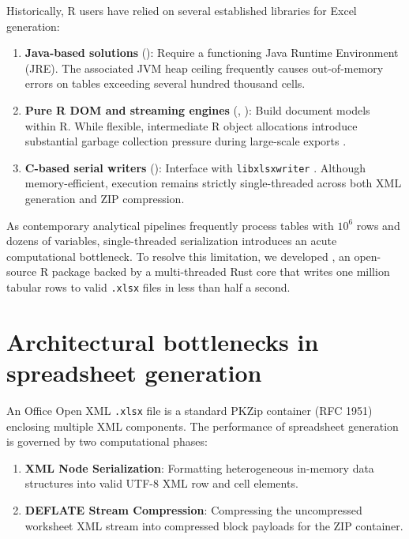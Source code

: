 Historically, R users have relied on several established libraries for Excel generation:

\begin{enumerate}
\def\labelenumi{\arabic{enumi}.}
\tightlist
\item
  \textbf{Java-based solutions} (): Require a functioning Java Runtime Environment (JRE). The associated JVM heap ceiling frequently causes out-of-memory errors on tables exceeding several hundred thousand cells.
\item
  \textbf{Pure R DOM and streaming engines} (, ): Build document models within R. While flexible, intermediate R object allocations introduce substantial garbage collection pressure during large-scale exports \citep{openxlsx2}.
\item
  \textbf{C-based serial writers} (): Interface with \texttt{libxlsxwriter} \citep{writexl}. Although memory-efficient, execution remains strictly single-threaded across both XML generation and ZIP compression.
\end{enumerate}

As contemporary analytical pipelines frequently process tables with \(10^6\) rows and dozens of variables, single-threaded serialization introduces an acute computational bottleneck. To resolve this limitation, we developed , an open-source R package backed by a multi-threaded Rust core that writes one million tabular rows to valid \texttt{.xlsx} files in less than half a second.

\section{Architectural bottlenecks in spreadsheet generation}\label{architectural-bottlenecks-in-spreadsheet-generation}

An Office Open XML \texttt{.xlsx} file is a standard PKZip container (RFC 1951) enclosing multiple XML components. The performance of spreadsheet generation is governed by two computational phases:

\begin{enumerate}
\def\labelenumi{\arabic{enumi}.}
\tightlist
\item
  \textbf{XML Node Serialization}: Formatting heterogeneous in-memory data structures into valid UTF-8 XML row and cell elements.
\item
  \textbf{DEFLATE Stream Compression}: Compressing the uncompressed worksheet XML stream into compressed block payloads for the ZIP container.
\end{enumerate}

